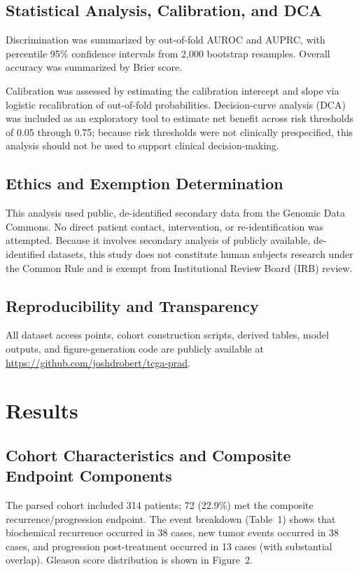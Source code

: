 \documentclass[11pt]{article}
\begin{document}
\subsection{Statistical Analysis, Calibration, and DCA}
Discrimination was summarized by out-of-fold AUROC and AUPRC, with percentile 95\% confidence intervals from 2,000 bootstrap resamples. Overall accuracy was summarized by Brier score. 

Calibration was assessed by estimating the calibration intercept and slope via logistic recalibration of out-of-fold probabilities. Decision-curve analysis (DCA) was included as an exploratory tool to estimate net benefit across risk thresholds of 0.05 through 0.75; because risk thresholds were not clinically prespecified, this analysis should not be used to support clinical decision-making.

\subsection{Ethics and Exemption Determination}
This analysis used public, de-identified secondary data from the Genomic Data Commons. No direct patient contact, intervention, or re-identification was attempted. Because it involves secondary analysis of publicly available, de-identified datasets, this study does not constitute human subjects research under the Common Rule and is exempt from Institutional Review Board (IRB) review.

\subsection{Reproducibility and Transparency}
All dataset access points, cohort construction scripts, derived tables, model outputs, and figure-generation code are publicly available at \url{https://github.com/joshdrobert/tcga-prad}.

\section{Results}
\subsection{Cohort Characteristics and Composite Endpoint Components}
The parsed cohort included 314 patients; 72 (22.9\%) met the composite recurrence/progression endpoint. The event breakdown (Table~1) shows that biochemical recurrence occurred in 38 cases, new tumor events occurred in 38 cases, and progression post-treatment occurred in 13 cases (with substantial overlap). Gleason score distribution is shown in Figure~2.
\end{document}
